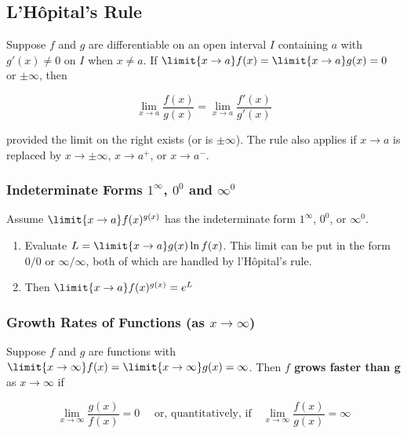 %
%
%

\subsection{L'H\^opital's Rule}
Suppose $f$ and $g$ are differentiable on an open interval $I$ containing $a$ with $g'(x) \neq 0$ on $I$ when $x \neq a$. If $\limit{x \rightarrow a} f(x) = \limit{x \rightarrow a} g(x) = 0$ or $\pm\infty$, then 

\begin{equation}
    \lim_{x\rightarrow a} \frac{f(x)}{g(x)} = \lim_{x \rightarrow a} \frac{f'(x)}{g'(x)}
\end{equation}

provided the limit on the right exists (or is $\pm \infty$). The rule also applies if $x \rightarrow a$ is replaced by $x \rightarrow \pm\infty$, $x \rightarrow a^+$, or $x \rightarrow a^-$.

\subsubsection{Indeterminate Forms $1^\infty$, $0^0$ and $\infty^0$}
Assume $\limit{x \rightarrow a} f(x)^{g(x)}$ has the indeterminate form $1^{\infty}$, $0^0$, or $\infty^0$.

\begin{enumerate}
    \item Evaluate $L = \limit{x \rightarrow a} g(x) \ln f(x)$. This limit can be put in the form $0 / 0$ or $\infty / \infty$, both of which are handled by l'H\^opital's rule.
    \item Then $\limit{x \rightarrow a} f(x) ^{g(x)} = e^L$
\end{enumerate}


\subsubsection{Growth Rates of Functions (as $x \rightarrow \infty$)}
Suppose $f$ and $g$ are functions with $\limit{x \rightarrow \infty} f(x) = \limit{x \rightarrow \infty} g(x) = \infty$. Then \textbf{$f$ grows faster than g} as $x \rightarrow \infty$ if

\begin{equation}
    \lim_{x \rightarrow \infty} \frac{g(x)}{f(x)} = 0 \quad \text{ or, quantitatively, if} \quad \lim _{x \rightarrow \infty} \frac{f(x)}{g(x)} = \infty
\end{equation}

